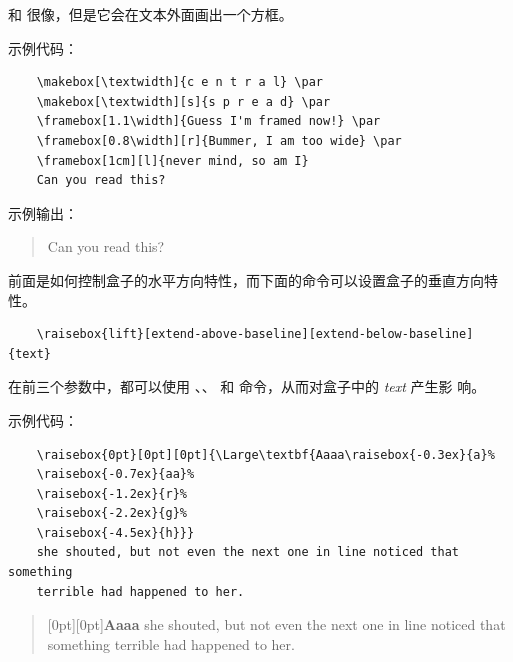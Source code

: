 \documentclass[UTF8]{ctexart}
\begin{document}
\texttt{\framebox} 和 \texttt{\makebox} 很像，但是它会在文本外面画出一个方框。

示例代码：
\begin{verbatim}
    \makebox[\textwidth]{c e n t r a l} \par
    \makebox[\textwidth][s]{s p r e a d} \par
    \framebox[1.1\width]{Guess I'm framed now!} \par
    \framebox[0.8\width][r]{Bummer, I am too wide} \par
    \framebox[1cm][l]{never mind, so am I}
    Can you read this?
\end{verbatim}

示例输出：
\begin{quote}
     \par
     \par
     \par
     \par
    Can you read this?
\end{quote}

前面是如何控制盒子的水平方向特性，而下面的命令可以设置盒子的垂直方向特性。
\begin{verbatim}
    \raisebox{lift}[extend-above-baseline][extend-below-baseline]{text}
\end{verbatim}
在前三个参数中，都可以使用 \texttt{\width}、\texttt{\height}、
\texttt{\depth} 和 \texttt{\totalheight} 命令，从而对盒子中的 \emph{text} 产生影
响。

示例代码：
\begin{verbatim}
    \raisebox{0pt}[0pt][0pt]{\Large\textbf{Aaaa\raisebox{-0.3ex}{a}%
    \raisebox{-0.7ex}{aa}%
    \raisebox{-1.2ex}{r}%
    \raisebox{-2.2ex}{g}%
    \raisebox{-4.5ex}{h}}}
    she shouted, but not even the next one in line noticed that something
    terrible had happened to her.
\end{verbatim}

\begin{quote}
    \raisebox{0pt}[0pt][0pt]{\Large\textbf{Aaaa%
    }}
    she shouted, but not even the next one in line noticed that something
    terrible had happened to her.
\end{quote}
\end{document}
